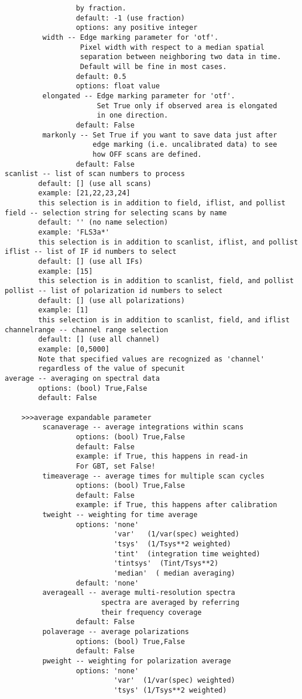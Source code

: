 \begin{verbatim}
                 by fraction.
                 default: -1 (use fraction)
                 options: any positive integer
         width -- Edge marking parameter for 'otf'.
                  Pixel width with respect to a median spatial 
                  separation between neighboring two data in time.
                  Default will be fine in most cases.
                 default: 0.5
                 options: float value
         elongated -- Edge marking parameter for 'otf'.
                      Set True only if observed area is elongated 
                      in one direction.
                 default: False
         markonly -- Set True if you want to save data just after 
                     edge marking (i.e. uncalibrated data) to see 
                     how OFF scans are defined.
                 default: False
scanlist -- list of scan numbers to process
        default: [] (use all scans)
        example: [21,22,23,24]
        this selection is in addition to field, iflist, and pollist
field -- selection string for selecting scans by name
        default: '' (no name selection)
        example: 'FLS3a*'
        this selection is in addition to scanlist, iflist, and pollist
iflist -- list of IF id numbers to select
        default: [] (use all IFs)
        example: [15]
        this selection is in addition to scanlist, field, and pollist
pollist -- list of polarization id numbers to select
        default: [] (use all polarizations)
        example: [1]
        this selection is in addition to scanlist, field, and iflist
channelrange -- channel range selection
        default: [] (use all channel)
        example: [0,5000]
        Note that specified values are recognized as 'channel' 
        regardless of the value of specunit 
average -- averaging on spectral data 
        options: (bool) True,False
        default: False

    >>>average expandable parameter
         scanaverage -- average integrations within scans
                 options: (bool) True,False
                 default: False
                 example: if True, this happens in read-in
                 For GBT, set False!
         timeaverage -- average times for multiple scan cycles
                 options: (bool) True,False
                 default: False
                 example: if True, this happens after calibration
         tweight -- weighting for time average
                 options: 'none'
                          'var'   (1/var(spec) weighted)
                          'tsys'  (1/Tsys**2 weighted)
                          'tint'  (integration time weighted)
                          'tintsys'  (Tint/Tsys**2)
                          'median'  ( median averaging)
                 default: 'none'
         averageall -- average multi-resolution spectra
                       spectra are averaged by referring 
                       their frequency coverage
                 default: False
         polaverage -- average polarizations
                 options: (bool) True,False
                 default: False
         pweight -- weighting for polarization average
                 options: 'none'
                          'var'  (1/var(spec) weighted)
                          'tsys' (1/Tsys**2 weighted)


\end{verbatim}
